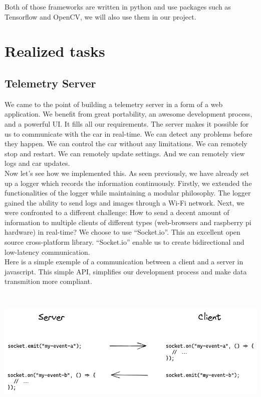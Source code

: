 \documentclass[12pt]{article}
\begin{document}
Both of those frameworks are written in python and use packages such as Tensorflow and OpenCV, we will also use them in our project.
\newpage



\section{Realized tasks}

\subsection{Telemetry Server}
We came to the point of building a telemetry server in a form of a web application. We benefit from great portability, an awesome development process, and a powerful UI. It fills all our requirements. The server makes it possible for us to communicate with the car in real-time. We can detect any problems before they happen. We can control the car without any limitations. We can remotely stop and restart. We can remotely update settings. And we can remotely view logs and car updates. \\ 

Now let's see how we implemented this. As seen previously, we have already set up a logger which records the information continuously. Firstly, we extended the functionalities of the logger while maintaining a modular philosophy. The logger gained the ability to send logs and images through a Wi-Fi network. Next, we were confronted to a different challenge: How to send a decent amount of information to multiple clients of different types (web-browsers and raspberry pi hardware) in real-time? We choose to use “Socket.io”. This an excellent open source cross-platform library. “Socket.io” enable us to create bidirectional and low-latency communication. \\ 

Here is a simple exemple of a communication between a client and a server in javascript. This simple API, simplifies our development process and make data transmition more compliant. \\ \\
\centerline{\includegraphics[height=5cm]{../../docs/server-client.png}}
\end{document}
